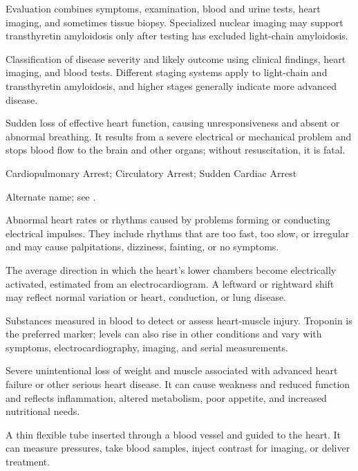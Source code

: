  Evaluation combines symptoms, examination, blood and urine tests, heart imaging, and sometimes tissue biopsy. Specialized nuclear imaging may support transthyretin amyloidosis only after testing has excluded light-chain amyloidosis.

 Classification of disease severity and likely outcome using clinical findings, heart imaging, and blood tests. Different staging systems apply to light-chain and transthyretin amyloidosis, and higher stages generally indicate more advanced disease.

 Sudden loss of effective heart function, causing unresponsiveness and absent or abnormal breathing. It results from a severe electrical or mechanical problem and stops blood flow to the brain and other organs; without resuscitation, it is fatal.

\synonyms
Cardiopulmonary Arrest; Circulatory Arrest; Sudden Cardiac Arrest

 Alternate name; see .

 Abnormal heart rates or rhythms caused by problems forming or conducting electrical impulses. They include rhythms that are too fast, too slow, or irregular and may cause palpitations, dizziness, fainting, or no symptoms.

 The average direction in which the heart's lower chambers become electrically activated, estimated from an electrocardiogram. A leftward or rightward shift may reflect normal variation or heart, conduction, or lung disease.

 Substances measured in blood to detect or assess heart-muscle injury. Troponin is the preferred marker; levels can also rise in other conditions and vary with symptoms, electrocardiography, imaging, and serial measurements.

 Severe unintentional loss of weight and muscle associated with advanced heart failure or other serious heart disease. It can cause weakness and reduced function and reflects inflammation, altered metabolism, poor appetite, and increased nutritional needs.

 A thin flexible tube inserted through a blood vessel and guided to the heart. It can measure pressures, take blood samples, inject contrast for imaging, or deliver treatment.

